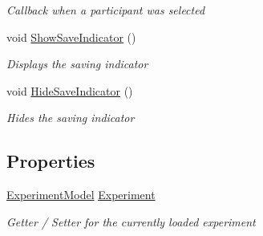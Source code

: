 \begin{DoxyCompactItemize}
\begin{DoxyCompactList}\small\item\em Callback when a participant was selected \end{DoxyCompactList}\item 
void \hyperlink{class_web_analyzer_1_1_u_i_1_1_interaction_objects_1_1_testrun_control_a63c62507fe21c9a5af3ec6fcef4072d3}{Show\+Save\+Indicator} ()
\begin{DoxyCompactList}\small\item\em Displays the saving indicator \end{DoxyCompactList}\item 
void \hyperlink{class_web_analyzer_1_1_u_i_1_1_interaction_objects_1_1_testrun_control_a607f5823a334e7a7bed326085fb65bc6}{Hide\+Save\+Indicator} ()
\begin{DoxyCompactList}\small\item\em Hides the saving indicator \end{DoxyCompactList}\end{DoxyCompactItemize}
\subsection*{Properties}
\begin{DoxyCompactItemize}
\item 
\hyperlink{class_web_analyzer_1_1_models_1_1_base_1_1_experiment_model}{Experiment\+Model} \hyperlink{class_web_analyzer_1_1_u_i_1_1_interaction_objects_1_1_testrun_control_a050243f65141cdf9dd7aa11125a30c0a}{Experiment}
\begin{DoxyCompactList}\small\item\em Getter / Setter for the currently loaded experiment \end{DoxyCompactList}\end{DoxyCompactItemize}
